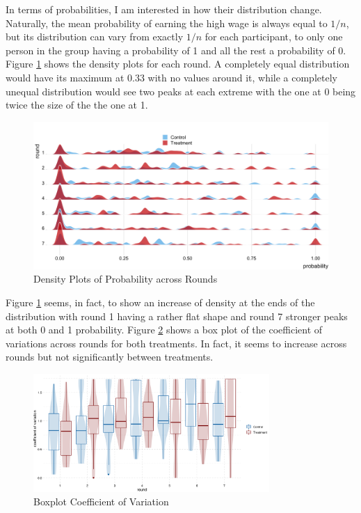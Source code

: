 In terms of probabilities, I am interested in how their distribution change. Naturally, the mean probability of earning the high wage is always equal to $1/n$, but its distribution can vary from exactly $1/n$ for each participant, to only one person in the group having a probability of 1 and all the rest a probability of 0. Figure \ref{fig:dens_prob} shows the density plots for each round. A completely equal distribution would have its maximum at 0.33 with no values around it, while a completely unequal distribution would see two peaks at each extreme with the one at 0 being twice the size of the the one at 1.\\

\begin{figure}[H]
    \centering
    \includegraphics[width = \textwidth]{graphs/density_ridge_prob.png}
    \caption{Density Plots of Probability across Rounds}
    \label{fig:dens_prob}
\end{figure}

Figure \ref{fig:dens_prob} seems, in fact, to show an increase of density at the ends of the distribution with round 1 having a rather flat shape and round 7 stronger peaks at both 0 and 1 probability. Figure \ref{fig:var_coeff_boxplot} shows a box plot of the coefficient of variations across rounds for both treatments. In fact, it seems to increase across rounds but not significantly between treatments.\\

\begin{figure}[H]
    \centering
    \includegraphics[width = 0.8\textwidth]{graphs/var_coeff_prob_boxplot.png}
    \caption{Boxplot Coefficient of Variation}
    \label{fig:var_coeff_boxplot}
\end{figure}

